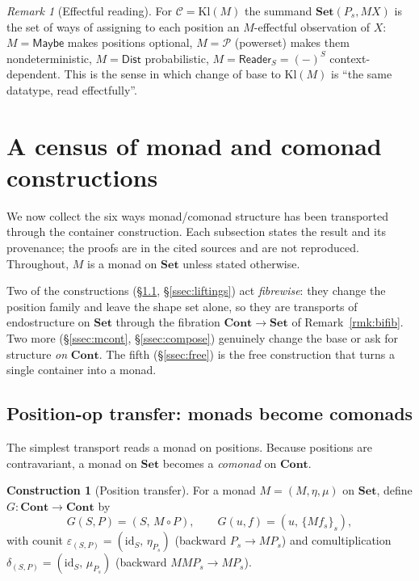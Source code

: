 \documentclass[11pt]{amsart}
\theoremstyle{plain}
\theoremstyle{definition}
\newtheorem{construction}[theorem]{Construction}
\theoremstyle{remark}
\newtheorem{remark}[theorem]{Remark}
\newcommand{\Set}{\mathbf{Set}}
\newcommand{\Cont}{\mathbf{Cont}}
\newcommand{\Kl}{\mathrm{Kl}}
\newcommand{\id}{\mathrm{id}}
\newcommand{\Maybe}{\mathsf{Maybe}}
\newcommand{\Reader}{\mathsf{Reader}}
\newcommand{\Dist}{\mathsf{Dist}}
\newcommand{\PP}{\mathcal{P}}
\newcommand{\C}{\mathcal{C}}
\begin{document}
\begin{remark}[Effectful reading]
For $\C=\Kl(M)$ the summand $\Set(P_s,MX)$ is the set of ways of assigning to each position an
$M$-effectful observation of $X$: $M=\Maybe$ makes positions optional, $M=\PP$ (powerset) makes them
nondeterministic, $M=\Dist$ probabilistic, $M=\Reader_S=(-)^S$ context-dependent. This is the sense in
which change of base to $\Kl(M)$ is ``the same datatype, read effectfully''.
\end{remark}

\section{A census of monad and comonad constructions}\label{sec:census}

We now collect the six ways monad/comonad structure has been transported through the container
construction. Each subsection states the result and its provenance; the proofs are in the cited
sources and are not reproduced. Throughout, $M$ is a monad on $\Set$ unless stated otherwise.

Two of the constructions (\S\ref{ssec:transfer}, \S\ref{ssec:liftings}) act \emph{fibrewise}: they
change the position family and leave the shape set alone, so they are transports of endostructure on
$\Set$ through the fibration $\Cont\to\Set$ of Remark~\ref{rmk:bifib}. Two more (\S\ref{ssec:mcont},
\S\ref{ssec:compose}) genuinely change the base or ask for structure \emph{on} $\Cont$. The fifth
(\S\ref{ssec:free}) is the free construction that turns a single container into a monad.

\subsection{Position-op transfer: monads become comonads}\label{ssec:transfer}
The simplest transport reads a monad on positions. Because positions are contravariant, a monad on
$\Set$ becomes a \emph{comonad} on $\Cont$.

\begin{construction}[Position transfer]\label{con:transfer}
For a monad $M=(M,\eta,\mu)$ on $\Set$, define $G\colon\Cont\to\Cont$ by
\[
  G(S,P)=(S,\,M\circ P),\qquad G(u,f)=(u,\,\{M f_s\}_s),
\]
with counit $\varepsilon_{(S,P)}=(\id_S,\,\eta_{P_s})$ (backward $P_s\to MP_s$) and comultiplication
$\delta_{(S,P)}=(\id_S,\,\mu_{P_s})$ (backward $MMP_s\to MP_s$).
\end{construction}
\end{document}
